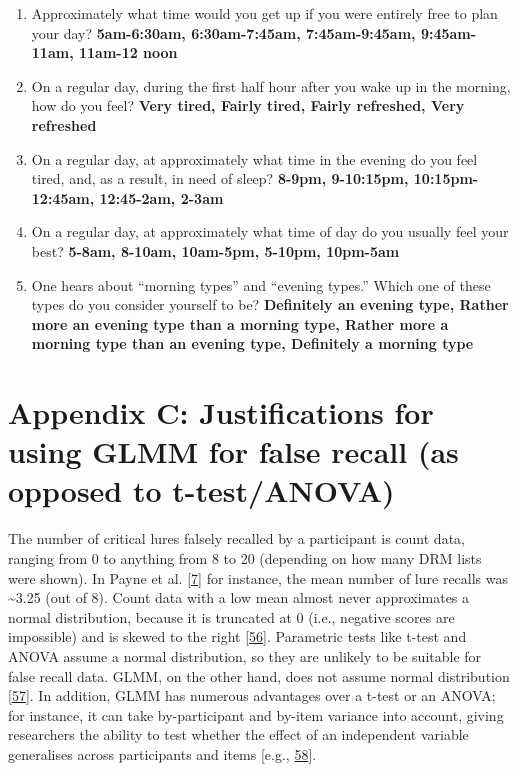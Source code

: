 \documentclass[
]{article}
\begin{document}
\begin{enumerate}
\def\labelenumi{\arabic{enumi}.}
\setcounter{enumi}{10}
\item
  Approximately what time would you get up if you were entirely free to plan your day?
  \textbf{5am-6:30am, 6:30am-7:45am, 7:45am-9:45am, 9:45am-11am, 11am-12 noon}
\item
  On a regular day, during the first half hour after you wake up in the morning, how do you feel?
  \textbf{Very tired, Fairly tired, Fairly refreshed, Very refreshed}
\item
  On a regular day, at approximately what time in the evening do you feel tired, and, as a result, in need of sleep?
  \textbf{8-9pm, 9-10:15pm, 10:15pm-12:45am, 12:45-2am, 2-3am}
\item
  On a regular day, at approximately what time of day do you usually feel your best?
  \textbf{5-8am, 8-10am, 10am-5pm, 5-10pm, 10pm-5am}
\item
  One hears about ``morning types'' and ``evening types.'' Which one of these types do you consider yourself to be?
  \textbf{Definitely an evening type, Rather more an evening type than a morning type, Rather more a morning type than an evening type, Definitely a morning type}
\end{enumerate}

\hypertarget{appendix-c-justifications-for-using-glmm-for-false-recall-as-opposed-to-t-testanova}{%
\section*{Appendix C: Justifications for using GLMM for false recall (as opposed to t-test/ANOVA)}\label{appendix-c-justifications-for-using-glmm-for-false-recall-as-opposed-to-t-testanova}}

The number of critical lures falsely recalled by a participant is count data, ranging from 0 to anything from 8 to 20 (depending on how many DRM lists were shown). In Payne et al. {[}\protect\hyperlink{ref-payne2009a}{7}{]} for instance, the mean number of lure recalls was \textasciitilde3.25 (out of 8). Count data with a low mean almost never approximates a normal distribution, because it is truncated at 0 (i.e., negative scores are impossible) and is skewed to the right {[}\protect\hyperlink{ref-herbison-a}{56}{]}. Parametric tests like t-test and ANOVA assume a normal distribution, so they are unlikely to be suitable for false recall data. GLMM, on the other hand, does not assume normal distribution {[}\protect\hyperlink{ref-lo2015a}{57}{]}. In addition, GLMM has numerous advantages over a t-test or an ANOVA; for instance, it can take by-participant and by-item variance into account, giving researchers the ability to test whether the effect of an independent variable generalises across participants and items {[}e.g., \protect\hyperlink{ref-brysbaert2018a}{58}{]}.
\end{document}
